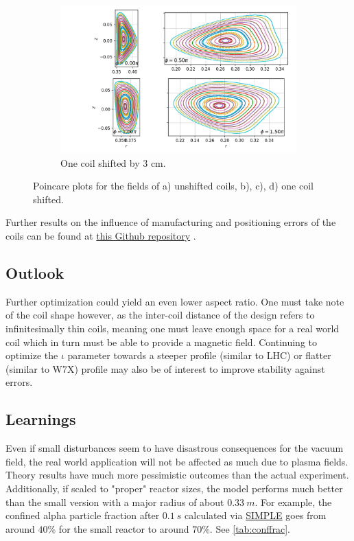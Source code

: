 \begin{figure}[H]
\captionsetup[subfigure]{justification=centering}
\ContinuedFloat
\begin{subfigure}{1.0\textwidth}
\centering
\includegraphics[scale=0.7]{Images/03_Design/3cm.png}
\caption{One coil shifted by 3 cm.}
\label{fig:3cm_shifted}
\end{subfigure}

\caption{Poincare plots for the fields of a) unshifted coils, b), c), d) one coil shifted.}
\label{fig:poincare_shifted_coils}
\end{figure}

Further results on the influence of manufacturing and positioning errors of the coils can be found at \href{https://github.com/itpplasma/reactor24}{this Github repository} \cite{design_repo}.

\subsection{Outlook}
Further optimization could yield an even lower aspect ratio.
One must take note of the coil shape however, as the inter-coil distance of the design refers to infinitesimally thin coils, meaning one must leave enough space for a real world coil which in turn must be able to provide a magnetic field.
Continuing to optimize the $\iota$ parameter towards a steeper profile (similar to LHC) or flatter (similar to W7X) profile may also be of interest to improve stability against errors.

\subsection{Learnings}
Even if small disturbances seem to have disastrous consequences for the vacuum field, the real world application will not be affected as much due to plasma fields. Theory results have much more pessimistic outcomes than the actual experiment.\\
Additionally, if scaled to "proper" reactor sizes, the model performs much better than the small version with a major radius of about $0.33~\unit{m}$. For example, the confined alpha particle fraction after $0.1~\unit{s}$ calculated via \href{https://github.com/itpplasma/SIMPLE}{SIMPLE} goes from around $40\%$ for the small reactor to around $70\%$. See \autoref{tab:conffrac}.
